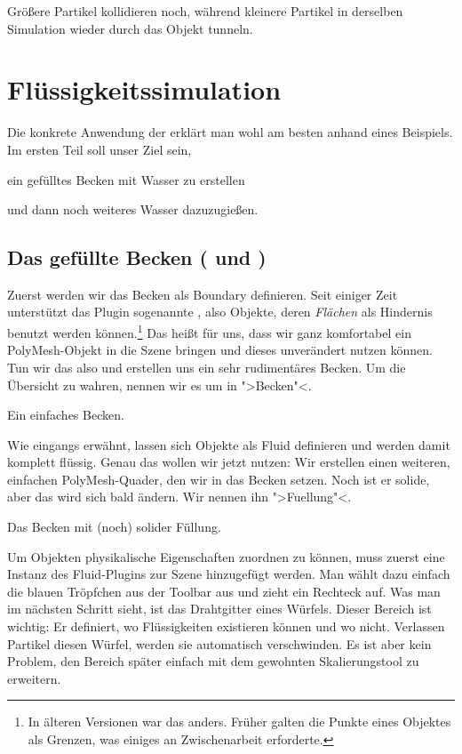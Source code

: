 \documentclass[10pt,DIV=14,a4paper]{scrartcl}
\begin{document}
{Größere Partikel kollidieren noch, während kleinere Partikel in
derselben Simulation wieder durch das Objekt tunneln.}



\pagebreak
\section{Flüssigkeitssimulation}

Die konkrete Anwendung der \fluidsim erklärt man wohl am besten anhand
eines Beispiels. Im ersten Teil soll unser Ziel sein,
\itA
	\item ein gefülltes Becken mit Wasser zu erstellen
	\item und dann noch weiteres Wasser dazuzugießen.
\itE

\subsection{Das gefüllte Becken ( und )}
Zuerst werden wir das Becken als Boundary definieren. Seit einiger Zeit
unterstützt das Plugin sogenannte , also Objekte,
deren \emph{Flächen} als Hindernis benutzt werden können.\footnote{In
älteren Versionen war das anders. Früher galten die Punkte eines
Objektes als Grenzen, was einiges an Zwischenarbeit erforderte.} Das
heißt für uns, dass wir ganz komfortabel ein PolyMesh-Objekt in die
Szene bringen und dieses unverändert nutzen können. Tun wir das also und
erstellen uns ein sehr rudimentäres Becken. Um die Übersicht zu wahren,
nennen wir es um in ">Becken"<.

{Ein einfaches Becken.}

Wie eingangs erwähnt, lassen sich Objekte als Fluid definieren und
werden damit komplett flüssig. Genau das wollen wir jetzt nutzen: Wir
erstellen einen weiteren, einfachen PolyMesh-Quader, den wir in das
Becken setzen. Noch ist er solide, aber das wird sich bald ändern. Wir
nennen ihn ">Fuellung"<.

{Das Becken mit (noch) solider Füllung.}

Um Objekten physikalische Eigenschaften zuordnen zu können, muss zuerst
eine Instanz des Fluid-Plugins zur Szene hinzugefügt werden. Man wählt
dazu einfach die blauen Tröpfchen aus der Toolbar aus und zieht ein
Rechteck auf. Was man im nächsten Schritt sieht, ist das Drahtgitter
eines Würfels. Dieser Bereich ist wichtig: Er definiert, wo
Flüssigkeiten existieren können und wo nicht. Verlassen Partikel diesen
Würfel, werden sie automatisch verschwinden. Es ist aber kein Problem,
den Bereich später einfach mit dem gewohnten Skalierungstool zu
erweitern.
\end{document}
